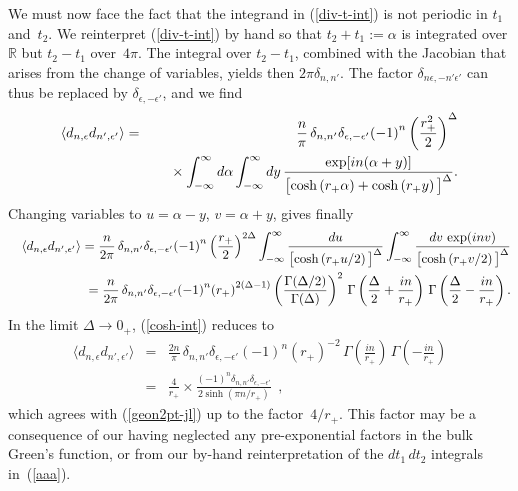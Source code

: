 \documentclass[a4paper,12pt]{article}
\begin{document}
We must now face the fact that the integrand in (\ref{div-t-int}) is not
periodic in $t_1$ and~$t_2$.  We reinterpret (\ref{div-t-int}) by hand
so that $t_2 + t_1 := \alpha$ is integrated over
$\mathbb R$ but $t_2 - t_1$ over~$4\pi$. The integral over $t_2 - t_1$,
combined 
with the Jacobian that arises from the change of variables, yields 
then $2\pi\delta_{n,n'}$. The factor 
$\delta_{n\epsilon,
-n'\epsilon'}$ 
can thus be replaced by $\delta_{\epsilon, -\epsilon'}$,
and we find
\begin{eqnarray} 
\langle 
d_{n,\epsilon} d_{n',\epsilon'} 
\rangle
&=&
\frac{n}{\pi} 
\, 
\delta_{n, n'} 
\delta_{\epsilon, -\epsilon'} 
{(-1)}^{n}
\left(\frac{r_+^2}{2}\right)^\Delta 
\nonumber
\\
&&
\phantom{xx}
\times 
\int_{-\infty}^{\infty} d\alpha 
\int_{-\infty}^{\infty} dy 
\, 
\frac{ \exp[in(\alpha + y)] } 
{ \left[
\cosh\left(r_+\alpha \right)
+ 
\cosh \left(r_+y \right) 
\vphantom{A^A_A}
\right]^\Delta
}.
\end{eqnarray}
Changing 
variables to $u = \alpha - y$, $v = \alpha + y$, gives 
finally \cite{Grad-Rhyz-cosh} 
\begin{eqnarray} 
&&\langle 
d_{n,\epsilon} d_{n',\epsilon'} 
\rangle
= 
\frac{n}{2\pi} 
\, 
\delta_{n, n'} 
\delta_{\epsilon, -\epsilon'} 
{(-1)}^{n}
\left(\frac{r_+}{2}\right)^{2\Delta} 
\int_{-\infty}^{\infty}
\frac{ du } 
{ \left[
\cosh\left(r_+u/2\right)
\vphantom{A^A_A}
\right]^\Delta
} 
\int_{-\infty}^{\infty}
\frac{ dv \, \exp(inv) } 
{ \left[
\cosh\left(r_+v/2\right)
\vphantom{A^A_A}
\right]^\Delta
} 
\nonumber
\\
&&
\phantom{xx}
= 
\frac{n}{2\pi} 
\, 
\delta_{n, n'} 
\delta_{\epsilon, -\epsilon'} 
{(-1)}^{n}
{(r_+)}^{2(\Delta-1)} 
\left( 
\frac{\Gamma(\Delta/2)}{\Gamma(\Delta)}
\right)^2 
\, 
\Gamma\left( 
\frac{\Delta}{2} + \frac{in}{r_+}
\right) 
\, 
\Gamma\left( 
\frac{\Delta}{2} - \frac{in}{r_+}
\right). 
\label{cosh-int}
\end{eqnarray}
In the limit $\Delta \to 0_+$, (\ref{cosh-int}) reduces to 
\begin{eqnarray} 
\langle 
d_{n,\epsilon} d_{n',\epsilon'} 
\rangle 
&=& 
\frac{2n}{\pi}  
\, 
\delta_{n, n'} 
\delta_{\epsilon, -\epsilon'} 
{(-1)}^{n}
{(r_+)}^{-2} 
\, 
\Gamma\left( 
\frac{in}{r_+}
\right) 
\, 
\Gamma\left( 
- \frac{in}{r_+}
\right) 
\nonumber
\\
&=&  
\frac{4}{r_+}
\times 
\frac{
{(-1)}^n \delta_{n,n'} \delta_{\epsilon,-\epsilon'}}
{2\sinh(\pi n/r_+)}
\ \ ,
\end{eqnarray}
which agrees with (\ref{geon2pt-jl}) up to the
factor~$4/r_+$. This factor may be a consequence of 
our having neglected any pre-exponential factors in the bulk Green's
function, or from our by-hand reinterpretation of the $dt_1 \, dt_2$
integrals in~(\ref{aaa}). 
\end{document}
